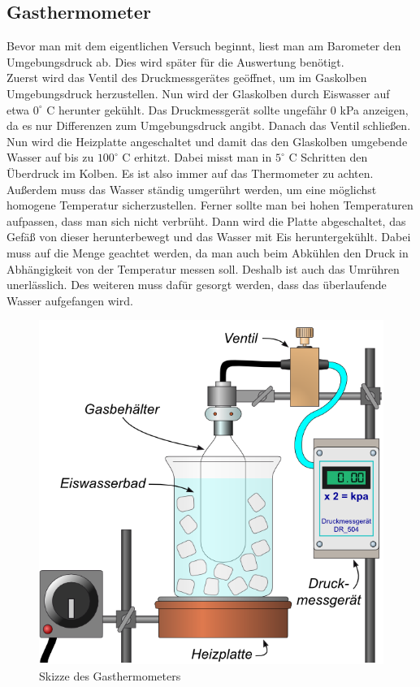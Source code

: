 \documentclass[12pt,a4paper,titlepage,headinclude,bibtotoc]{scrartcl}
\begin{document}
\subsection{Gasthermometer}
Bevor man mit dem eigentlichen Versuch beginnt, liest man am Barometer den Umgebungsdruck ab.
Dies wird später für die Auswertung benötigt.\\
Zuerst wird das Ventil des Druckmessgerätes geöffnet, um im Gaskolben Umgebungsdruck herzustellen.
Nun wird der Glaskolben durch Eiswasser auf etwa $0^\circ$ C herunter gekühlt.
Das Druckmessgerät sollte ungefähr 0 kPa anzeigen, da es nur Differenzen zum Umgebungsdruck angibt. Danach das Ventil schließen.\\
Nun wird die Heizplatte angeschaltet und damit das den Glaskolben umgebende Wasser auf bis zu $100^\circ$ C erhitzt.
Dabei misst man in $5^\circ$ C Schritten den Überdruck im Kolben.
Es ist also immer auf das Thermometer zu achten.
Außerdem muss das Wasser ständig umgerührt werden, um eine möglichst homogene Temperatur sicherzustellen.
Ferner sollte man bei hohen Temperaturen aufpassen, dass man sich nicht verbrüht.
Dann wird die Platte abgeschaltet, das Gefäß von dieser herunterbewegt und das Wasser mit Eis heruntergekühlt.
Dabei muss auf die Menge geachtet werden, da man auch beim Abkühlen den Druck in Abhängigkeit von der Temperatur messen soll.
Deshalb ist auch das Umrühren unerlässlich.
Des weiteren muss dafür gesorgt werden, dass das überlaufende Wasser aufgefangen wird. 
\begin{figure}[!h]
 \centering
 \includegraphics[scale=0.7]{GasthermometerSkizze.jpg}
 \caption{Skizze des Gasthermometers \cite{lp}}
 \label{fig:GTSkizze}
\end{figure}
\end{document}
